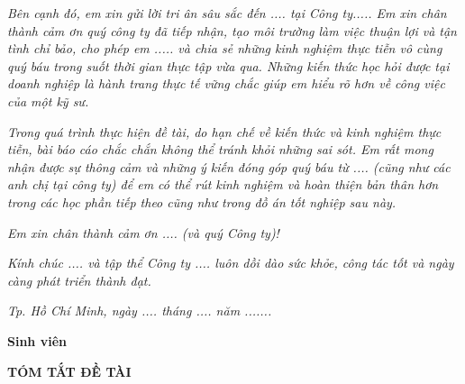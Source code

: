 \documentclass[12pt, a4paper, oneside]{article}
\begin{document}
\textit{Bên cạnh đó, em xin gửi lời tri ân sâu sắc đến .... tại Công ty..... Em xin chân thành cảm ơn quý công ty đã tiếp nhận, tạo môi trường làm việc thuận lợi và tận tình chỉ bảo, cho phép em ..... và chia sẻ những kinh nghiệm thực tiễn vô cùng quý báu trong suốt thời gian thực tập vừa qua. Những kiến thức học hỏi được tại doanh nghiệp là hành trang thực tế vững chắc giúp em hiểu rõ hơn về công việc của một kỹ sư.}

\textit{Trong quá trình thực hiện đề tài, do hạn chế về kiến thức và kinh nghiệm thực tiễn, bài báo cáo chắc chắn không thể tránh khỏi những sai sót. Em rất mong nhận được sự thông cảm và những ý kiến đóng góp quý báu từ .... (cũng như các anh chị tại công ty) để em có thể rút kinh nghiệm và hoàn thiện bản thân hơn trong các học phần tiếp theo cũng như trong đồ án tốt nghiệp sau này.}

\textit{Em xin chân thành cảm ơn .... (và quý Công ty)!}

\textit{Kính chúc .... và tập thể Công ty .... luôn dồi dào sức khỏe, công tác tốt và ngày càng phát triển thành đạt.}

\vspace{1cm}

\hspace{5cm}\textit{Tp. Hồ Chí Minh, ngày .... tháng .... năm .......}

\hspace{8cm}\textbf{Sinh viên}

\newpage
{}
\setcounter{page}{1}
\thispagestyle{empty}
\begin{center}
    \textbf{TÓM TẮT ĐỀ TÀI}
\end{center}



\newpage
\thispagestyle{empty}
\renewcommand{\contentsname}{\centering {MỤC LỤC}}
\tableofcontents

\newpage
\renewcommand{\listfigurename}{\centering DANH SÁCH HÌNH MINH HỌA}
\listoffigures %
\newpage
\renewcommand{\listtablename}{\centering DANH SÁCH BẢNG SỐ LIỆU}
\listoftables %



\newpage
\end{document}
